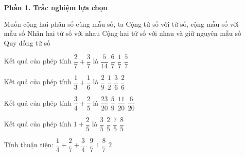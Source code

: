\textbf{Phần 1. Trắc nghiệm lựa chọn}

\begin{ex} %
Muốn cộng hai phân số cùng mẫu số, ta
\choice
{Cộng tử số với tử số, cộng mẫu số với mẫu số}
{Nhân hai tử số với nhau}
{\True Cộng hai tử số với nhau và giữ nguyên mẫu số}
{Quy đồng tử số}
\end{ex}

\begin{ex} %
Kết quả của phép tính $\dfrac{2}{7} + \dfrac{3}{7}$ là
\choice
{$\dfrac{5}{14}$}
{$\dfrac{6}{7}$}
{$\dfrac{1}{7}$}
{\True $\dfrac{5}{7}$}
\end{ex}

\begin{ex} %
Kết quả của phép tính $\dfrac{1}{3} + \dfrac{1}{6}$ là
\choice
{$\dfrac{2}{9}$}
{\True $\dfrac{1}{2}$}
{$\dfrac{3}{6}$}
{$\dfrac{2}{6}$}
\end{ex}

\begin{ex} %
Kết quả của phép tính $\dfrac{3}{4} + \dfrac{2}{5}$ là
\choice
{\True $\dfrac{23}{20}$}
{$\dfrac{5}{9}$}
{$\dfrac{11}{20}$}
{$\dfrac{6}{20}$}
\end{ex}

\begin{ex} %
Kết quả của phép tính $1 + \dfrac{2}{5}$ là
\choice
{$\dfrac{3}{5}$}
{$\dfrac{2}{5}$}
{\True $\dfrac{7}{5}$}
{$\dfrac{8}{5}$}
\end{ex}

\begin{ex} %
Tính thuận tiện: $\dfrac{1}{4} + \dfrac{2}{7} + \dfrac{3}{4}$.
\choice
{\True $\dfrac{9}{7}$}
{$1$}
{$\dfrac{8}{7}$}
{$2$}
\end{ex}

